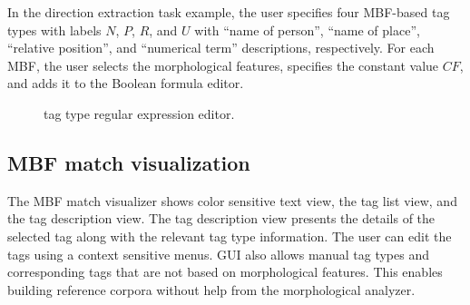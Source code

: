 In the direction extraction task example, the user specifies four MBF-based 
tag types with labels 
$N$, $P$, $R$, and $U$ with  ``name of person'', ``name of place'', 
``relative position'', and ``numerical term'' descriptions, respectively. 
For each MBF, the user selects the morphological features, 
specifies the constant value $CF$, and adds it to the Boolean formula editor. 
%

\begin{figure}[tb!]
  \centering
  {\setlength{\fboxsep}{0pt}%
  \setlength{\fboxrule}{0.5pt}%
  }
  \caption{\framework tag type regular expression editor.}
  \label{f:sfe}
\end{figure}

\subsection{MBF match visualization}

The MBF match visualizer shows color sensitive text view, the tag list view, and the tag description view. 
The tag description view presents the details of the selected tag along with 
the relevant tag type information.
%
The user can edit the tags using a context sensitive menus. 
\framework GUI also allows manual tag types and corresponding tags 
that are not based on morphological features.
This enables building reference corpora without 
help from the morphological analyzer.

